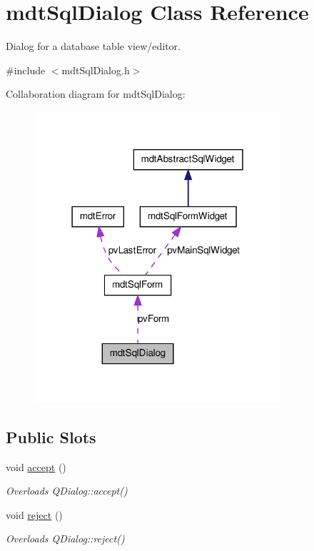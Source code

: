 \hypertarget{classmdt_sql_dialog}{
\section{mdtSqlDialog Class Reference}
\label{classmdt_sql_dialog}
}


Dialog for a database table view/editor.  




{\ttfamily \#include $<$mdtSqlDialog.h$>$}



Collaboration diagram for mdtSqlDialog:\nopagebreak
\begin{figure}[H]
\begin{center}
\leavevmode
\includegraphics[width=259pt]{classmdt_sql_dialog__coll__graph}
\end{center}
\end{figure}
\subsection*{Public Slots}
\begin{DoxyCompactItemize}
\item 
void \hyperlink{classmdt_sql_dialog_affba1732b5f32db150d0e700ecc339f8}{accept} ()
\begin{DoxyCompactList}\small\item\em Overloads QDialog::accept() \end{DoxyCompactList}\item 
void \hyperlink{classmdt_sql_dialog_ada1726d5861cb071fab7a1c31bc52abb}{reject} ()
\begin{DoxyCompactList}\small\item\em Overloads QDialog::reject() \end{DoxyCompactList}\end{DoxyCompactItemize}
